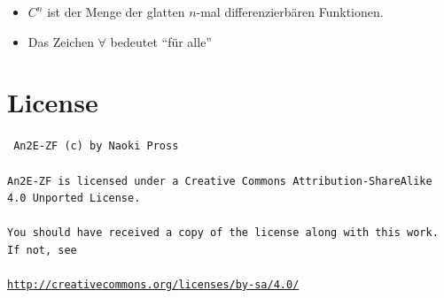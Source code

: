 \documentclass[a4paper, twocolumn]{article}
\numberwithin{equation}{subsection}
\begin{document}
\begin{itemize}
    \item \(C^n\) ist der Menge der glatten \(n\)-mal differenzierb\"aren Funktionen.
    \item Das Zeichen \(\forall\) bedeutet ``f\"ur alle''
\end{itemize}

\section*{License}
{ \tt
An2E-ZF (c) by Naoki Pross
\\\\
An2E-ZF is licensed under a Creative Commons Attribution-ShareAlike 4.0 Unported License.
\\\\
You should have received a copy of the license along with this work. If not, see 
\\\\
{\small\url{http://creativecommons.org/licenses/by-sa/4.0/}}
}


\onecolumn
\end{document}
